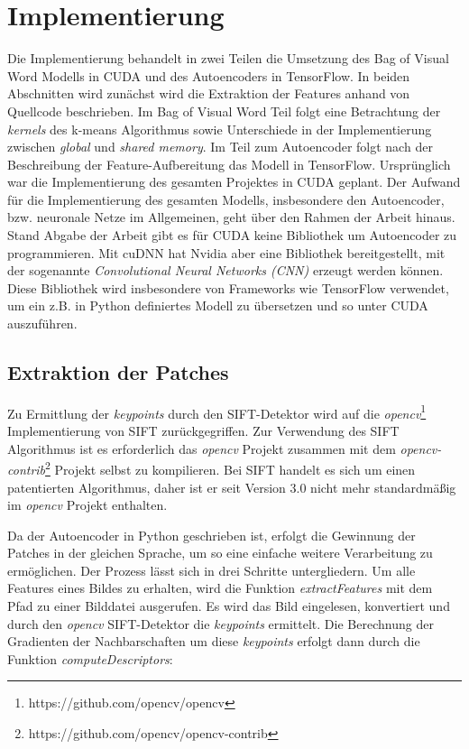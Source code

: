 \chapter{Implementierung}

Die Implementierung behandelt in zwei Teilen die Umsetzung des Bag of Visual Word Modells in CUDA und des Autoencoders in TensorFlow. In beiden Abschnitten wird zunächst wird die Extraktion der Features anhand von Quellcode beschrieben. Im Bag of Visual Word Teil folgt eine Betrachtung der \textit{kernels} des k-means Algorithmus sowie Unterschiede in der Implementierung zwischen \textit{global} und \textit{shared memory}. Im Teil zum Autoencoder folgt nach der Beschreibung der Feature-Aufbereitung das Modell in TensorFlow.\newline
Ursprünglich war die Implementierung des gesamten Projektes in CUDA geplant. Der Aufwand für die Implementierung des gesamten Modells, insbesondere den Autoencoder, bzw. neuronale Netze im Allgemeinen, geht über den Rahmen der Arbeit hinaus. Stand Abgabe der Arbeit gibt es für CUDA keine Bibliothek um Autoencoder zu programmieren. Mit cuDNN hat Nvidia aber eine Bibliothek bereitgestellt, mit der sogenannte \textit{Convolutional Neural Networks (CNN)} erzeugt werden können. Diese Bibliothek wird insbesondere von Frameworks wie TensorFlow verwendet, um ein z.B. in Python definiertes Modell zu übersetzen und so unter CUDA auszuführen.

\section{Extraktion der Patches}

Zu Ermittlung der \textit{keypoints} durch den SIFT-Detektor wird auf die \textit{opencv}\footnote{https://github.com/opencv/opencv} Implementierung von SIFT zurückgegriffen. Zur Verwendung des SIFT Algorithmus ist es erforderlich das \textit{opencv} Projekt zusammen mit dem \textit{opencv-contrib}\footnote{https://github.com/opencv/opencv-contrib} Projekt selbst zu kompilieren. Bei SIFT handelt es sich um einen patentierten Algorithmus, daher ist er seit Version 3.0 nicht mehr standardmäßig im \textit{opencv} Projekt enthalten.

Da der Autoencoder in Python geschrieben ist, erfolgt die Gewinnung der Patches in der gleichen Sprache, um so eine einfache weitere Verarbeitung zu ermöglichen. Der Prozess lässt sich in drei Schritte untergliedern. Um alle Features eines Bildes zu erhalten, wird die Funktion \textit{extractFeatures} mit dem Pfad zu einer Bilddatei ausgerufen. Es wird das Bild eingelesen, konvertiert und durch den \textit{opencv} SIFT-Detektor die \textit{keypoints} ermittelt. Die Berechnung der Gradienten der Nachbarschaften um diese \textit{keypoints} erfolgt dann durch die Funktion \textit{computeDescriptors}:

